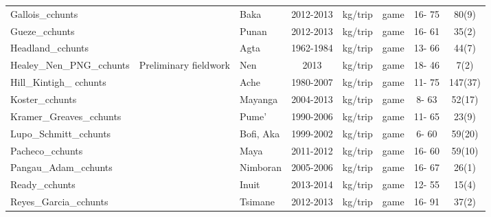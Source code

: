 \begin{landscape}
\begin{longtable}{M{2.6cm} M{3.6cm} M{1.5cm} c c M{1cm} c c}
Gallois\_cchunts               & \cite{reyes-garcia_adaptive_2016}         & Baka            & 2012-2013  & kg/trip   & game               & 16- 75  & 80(9)     \\
Gueze\_cchunts                 & \cite{reyes-garcia_adaptive_2016}         & Punan           & 2012-2013  & kg/trip   & game               & 16- 61  & 35(2)      \\
Headland\_cchunts              & \cite{headland_why_1986}                  & Agta            & 1962-1984  & kg/trip   & game               & 13- 66  & 44(7)     \\
Healey\_Nen\_PNG\_cchunts        & Preliminary fieldwork                     & Nen             & 2013       & kg/trip   & game               & 18- 46  & 7(2)        \\
Hill\_Kintigh\_ cchunts          & \cite{hill_can_2009}                      & Ache            & 1980-2007  & kg/trip   & game               & 11- 75  & 147(37)  \\
Koster\_cchunts                & \cite{koster_hunting_2008}                & Mayanga         & 2004-2013  & kg/trip   & game               & 8- 63   & 52(17)     \\
Kramer\_Greaves\_cchunts        & \cite{kramer_why_2017}                    & Pume'           & 1990-2006  & kg/trip   & game               & 11- 65  & 23(9)     \\
Lupo\_Schmitt\_cchunts          & \cite{lupo_upper_2002}                    & Bofi, Aka       & 1999-2002  & kg/trip   & game               & 6- 60   & 59(20)    \\
Pacheco\_cchunts               & \cite{pacheco-cobos_economic_2015}        & Maya            & 2011-2012  & kg/trip   & game               & 16- 60  & 59(10)     \\
Pangau\_Adam\_cchunts           & \cite{pangau-adam_wildmeat_2012}          & Nimboran        & 2005-2006  & kg/trip   & game               & 16- 67  & 26(1)      \\
Ready\_cchunts                 & \cite{ready_food_2016}                    & Inuit           & 2013-2014  & kg/trip   & game               & 12- 55  & 15(4)       \\
Reyes\_Garcia\_cchunts          & \cite{reyes-garcia_adaptive_2016}         & Tsimane         & 2012-2013  & kg/trip   & game               & 16- 91  & 37(2)      \\

\end{longtable}
\end{landscape}
